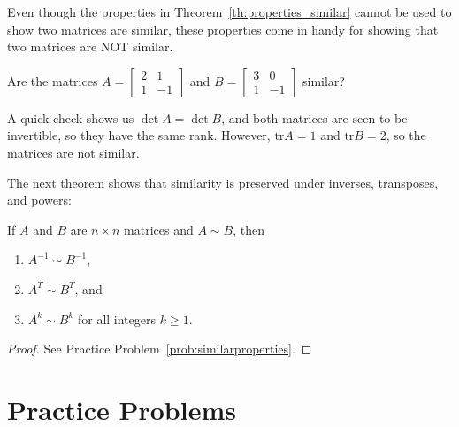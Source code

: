 \documentclass{ximera}
\begin{document}
Even though the properties in Theorem~\ref{th:properties_similar} cannot be used to show two matrices are similar, these properties come in handy for showing that two matrices are NOT similar.

\begin{example}\label{ex:areTheySimilar}
Are the matrices $A =
\begin{bmatrix}
2 & 1 \\
1 & -1
\end{bmatrix}$ and $B =
\begin{bmatrix}
3 & 0 \\
1 & -1
\end{bmatrix}$ similar?
\begin{explanation}
A quick check shows us $\det A = \det B$, and both matrices are seen to be invertible, so they have the same rank.  However, $\mbox{tr} A = 1$ and $\mbox{tr} B = 2$, so the matrices are not similar.
\end{explanation}
\end{example}

The next theorem shows that similarity is preserved under inverses, transposes, and powers:

\begin{theorem}\label{th:other_properties_similar}
If $A$ and $B$ are $n\times n$ matrices and $A\sim B$, then
\begin{enumerate}
\item\label{th:properties_similar_inverse} $A^{-1} \sim B^{-1}$,
\item\label{th:properties_similar_transpose} $A^T \sim B^T$, and
\item\label{th:properties_similar_powers} $A^k \sim B^k$ for all integers $k \geq 1$.
\end{enumerate}
\end{theorem}

\begin{proof}
See Practice Problem~\ref{prob:similarproperties}.
\end{proof}

\section*{Practice Problems}
\end{document}
